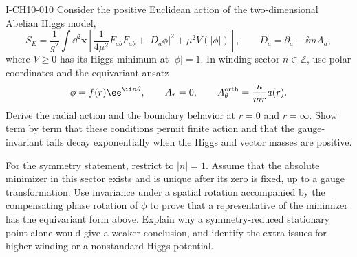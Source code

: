 \begin{exercise}{I-CH10-010}
Consider the positive Euclidean action of the two-dimensional Abelian Higgs
model,
\[
  S_E=\frac1{g^2}\int\dd^2\mathbf x\left[
    \frac{1}{4\mu^2}F_{ab}F_{ab}+|D_a\phi|^2
    +\mu^2V(|\phi|)\right],
  \qquad D_a=\partial_a-\ii mA_a,
\]
where $V\ge0$ has its Higgs minimum at $|\phi|=1$.  In winding sector
$n\in\mathbb Z$, use polar coordinates and the equivariant ansatz
\[
  \phi=f(r)\ee^{\ii n\theta},\qquad A_r=0,\qquad
  A_\theta^{\rm orth}=\frac{n}{mr}a(r).
\]
Derive the radial action and the boundary behavior at $r=0$ and $r=\infty$.
Show term by term that these conditions permit finite action and that the
gauge-invariant tails decay exponentially when the Higgs and vector masses are
positive.

For the symmetry statement, restrict to $|n|=1$.  Assume that the absolute
minimizer in this sector exists and is unique after its zero is fixed, up to a
gauge transformation.  Use invariance under a spatial rotation accompanied by
the compensating phase rotation of $\phi$ to prove that a representative of
the minimizer has the equivariant form above.  Explain why a symmetry-reduced
stationary point alone would give a weaker conclusion, and identify the extra
issues for higher winding or a nonstandard Higgs potential.
\end{exercise}
